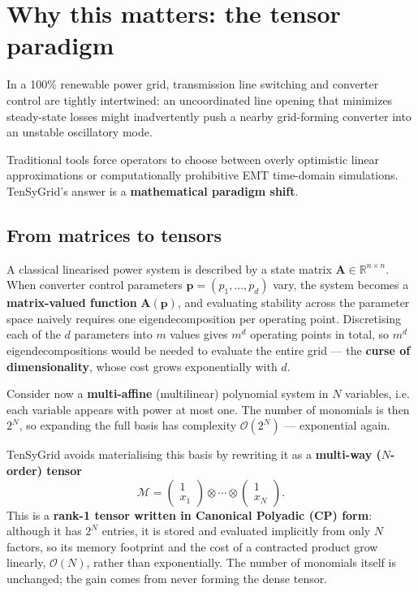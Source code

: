 \documentclass[11pt,a4paper]{article}
\begin{document}
\section{Why this matters: the tensor paradigm}
\label{sec:tensor}

In a 100\% renewable power grid, transmission line switching and converter control are tightly intertwined: an uncoordinated line opening that minimizes steady-state losses might inadvertently push a nearby grid-forming converter into an unstable oscillatory mode.

Traditional tools force operators to choose between overly optimistic linear approximations or computationally prohibitive EMT time-domain simulations. TenSyGrid's answer is a \textbf{mathematical paradigm shift}.

\subsection*{From matrices to tensors}

A classical linearised power system is described by a state matrix $\mathbf{A} \in \mathbb{R}^{n \times n}$. When converter control parameters $\mathbf{p} = (p_1, \ldots, p_d)$ vary, the system becomes a \textbf{matrix-valued function} $\mathbf{A}(\mathbf{p})$, and evaluating stability across the parameter space naively requires one eigendecomposition per operating point. Discretising each of the $d$ parameters into $m$ values gives $m^d$ operating points in total, so $m^d$ eigendecompositions would be needed to evaluate the entire grid --- the \textbf{curse of dimensionality}, whose cost grows exponentially with $d$.

Consider now a \textbf{multi-affine} (multilinear) polynomial system in $N$ variables, i.e. each variable appears with power at most one. The number of monomials is then $2^{N}$, so expanding the full basis has complexity $\mathcal{O}(2^{N})$ --- exponential again.

TenSyGrid avoids materialising this basis by rewriting it as a \textbf{multi-way ($N$-order) tensor}
\[
  \mathcal{M} = \begin{pmatrix}
    1 \\ {x}_1
  \end{pmatrix}  \otimes \cdots \otimes \begin{pmatrix}
    1 \\ {x}_{N}
  \end{pmatrix}.
\]
This is a \textbf{rank-1 tensor written in Canonical Polyadic (CP) form}: although it has $2^{N}$ entries, it is stored and evaluated implicitly from only $N$ factors, so its memory footprint and the cost of a contracted product grow linearly, $\mathcal{O}(N)$, rather than exponentially. The number of monomials itself is unchanged; the gain comes from never forming the dense tensor.\\
\end{document}
